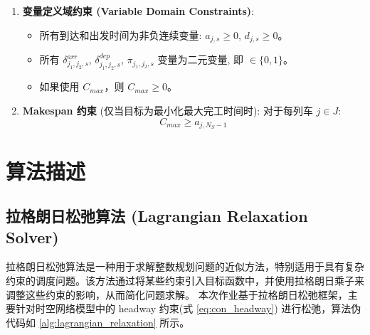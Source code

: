 \documentclass{article}
\begin{document}
\begin{enumerate}
    \item \textbf{变量定义域约束 (Variable Domain Constraints)}:
        \begin{itemize}
            \item 所有到达和出发时间为非负连续变量: $a_{j,s} \ge 0$, $d_{j,s} \ge 0$。
            \item 所有 $\delta^{arr}_{j_1,j_2,s}$,
                $\delta^{dep}_{j_1,j_2,s}$, $\pi_{j_1,j_2,s}$
                变量为二元变量, 即 $\in \{0,1\}$。
            \item 如果使用 $C_{max}$，则 $C_{max} \ge 0$。
        \end{itemize}

    \item \textbf{Makespan 约束} (仅当目标为最小化最大完工时间时): 对于每列车 $j \in J$:
        \begin{equation}
            C_{max} \ge a_{j,N_S-1}\label{eq:makespan_constraint}
        \end{equation}
\end{enumerate}

\section{算法描述}
\label{sec:algo_desc}

\subsection{拉格朗日松弛算法 (Lagrangian Relaxation
Solver)}\label{subsec:-(lagrangian-relaxation-solver)}
拉格朗日松弛算法是一种用于求解整数规划问题的近似方法，特别适用于具有复杂约束的调度问题。该方法通过将某些约束引入目标函数中，并使用拉格朗日乘子来调整这些约束的影响，从而简化问题求解。
本次作业基于拉格朗日松弛框架，主要针对时空网络模型中的 headway 约束(式 \ref{eq:con_headway})
进行松弛，算法伪代码如 \ref{alg:lagrangian_relaxation} 所示。
\end{document}
